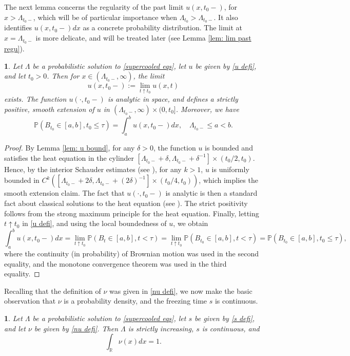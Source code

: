 \documentclass{article}
\numberwithin{equation}{section}
\numberwithin{figure}{section}
\theoremstyle{plain}
\theoremstyle{plain}
\theoremstyle{plain}
\theoremstyle{plain}
\newtheorem{lem}[thm]{\protect\lemmaname}
\theoremstyle{definition}
\theoremstyle{remark}
\def\R{{\mathbb{R}}}
\def\P{{\mathbb{P}}}
\providecommand{\lemmaname}{Lemma}
\begin{document}
The next lemma concerns the regularity of the past limit $u(x,t_0-)$, for $x>\Lambda_{t_0-}$, which will be of particular importance when $\Lambda_{t_0}>\Lambda_{t_0-}$. It also identifies $u(x,t_0-)dx$ as a concrete probability distribution. The limit at $x=\Lambda_{t_0-}$ is more delicate, and will be treated later (see Lemma \ref{lem: lim past regu}).
\begin{lem} \label{lem: smooth ext} Let $\Lambda$ be a probabilistic solution to \eqref{supercooled eqs}, let $u$ be given by \eqref{u defi}, and let $t_0>0$. Then for $x\in (\Lambda_{t_0-},\infty)$, the limit
\[ u(x,t_0-):=\lim_{t\uparrow t_0}u(x,t)\]
exists. The function $u(\cdot, t_0-)$ is analytic in space, and defines a strictly positive, smooth extension of $u$ in $(\Lambda_{t_0-},\infty)\times (0,t_0]$. Moreover, we have
\begin{equation} \label{u(t-) formula}
    \P(B_{t_0}\in [a,b], t_0\leq \tau) =\int_{a}^bu(x,t_0-)dx,  \quad \Lambda_{t_0-} \leq a <b.
\end{equation}
\end{lem}
\begin{proof} By Lemma \ref{lem: u bound}, for any $\delta>0$, the function $u$ is bounded and satisfies the heat equation in the cylinder $[\Lambda_{t_0-}+\delta,\Lambda_{t_0-}+\delta^{-1}] \times (t_0/2,t_0)$. Hence, by the interior Schauder estimates (see \cite[Thm. 4.9]{LiebermanBook}), for any $k>1$, $u$ is uniformly bounded in $C^{k}([\Lambda_{t_0-}+2\delta,\Lambda_{t_0-}+(2\delta)^{-1}] \times (t_0/4,t_0))$, which implies the smooth extension claim. The fact that $u(\cdot,t_0-)$ is analytic is then a standard fact about classical solutions to the heat equation (see \cite[Ch. VI, Thm. 1]{mikhailov}). The strict positivity follows from the strong maximum principle for the heat equation. Finally, letting $t\uparrow t_0$ in \eqref{u defi}, and using the local boundedness of $u$, we obtain
\[\int_{a}^bu(x,t_0-)dx=\lim_{t\uparrow t_0} \P(B_t\in [a,b], t< \tau)=\lim_{t\uparrow t_0} \P(B_{t_0}\in [a,b], t<\tau)=\P(B_{t_0}\in [a,b], t_0 \leq \tau),\]
where the continuity (in probability) of Brownian motion was used in the second equality, and the monotone convergence theorem was used in the third equality.
\end{proof}
Recalling that the definition of $\nu$ was given in \eqref{nu defi}, we now make the basic observation that $\nu$ is a probability density, and the freezing time $s$ is continuous.
\begin{lem}\label{lem: lambda strict incr}Let $\Lambda$ be a probabilistic solution to \eqref{supercooled eqs}, let $s$ be given by \eqref{s defi}, and let $\nu$ be given by \eqref{nu defi}. Then $\Lambda$ is strictly increasing, $s$ is continuous, and
\begin{equation}
    \int_{\R}\nu(x)dx=1.
\end{equation}
\end{lem}
\end{document}
